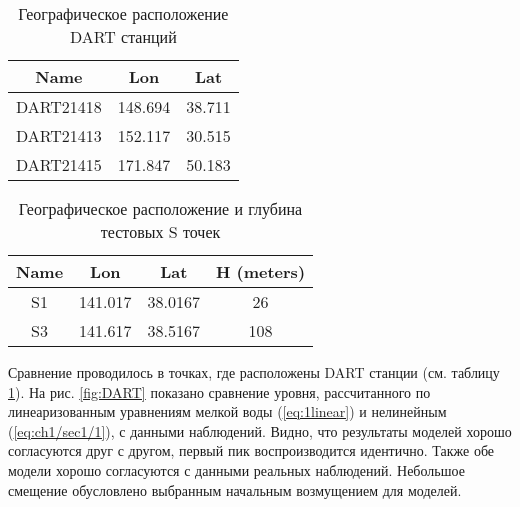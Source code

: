 \begin{table} [htbp]
\centering
\caption{Географическое расположение DART станций}\label{tab:DARTs}
	\begin{tabular}{c|c|c}
	  Name & Lon & Lat  \\
	  \hline
	  DART21418 & 148.694 & 38.711 \\ 
	  \hline
	  DART21413 & 152.117 & 30.515 \\
	  \hline
	  DART21415 & 171.847 & 50.183 \\
	  \hline
	\end{tabular}
\end{table}

\begin{table} [htbp]
\centering
\caption{Географическое расположение и глубина тестовых S точек}\label{tab:Ss}
	\begin{tabular}{c|c|c|c}
	  Name & Lon & Lat  & H (meters) \\
	  \hline
	  S1 & 141.017 & 38.0167 & 26 \\
	  \hline
	  S3 & 141.617 & 38.5167 & 108 \\
	  \hline
	\end{tabular}
\end{table}

Сравнение проводилось в точках, где расположены DART станции (см. таблицу \ref{tab:DARTs}).
На рис. \ref{fig:DART} показано сравнение уровня, рассчитанного по линеаризованным уравнениям мелкой воды (\ref{eq:1linear}) и нелинейным (\ref{eq:ch1/sec1/1}), с данными наблюдений. Видно, что результаты моделей хорошо согласуются друг с другом, первый пик воспроизводится идентично. Также обе модели хорошо согласуются с данными реальных наблюдений. Небольшое смещение обусловлено выбранным начальным возмущением для моделей. 

